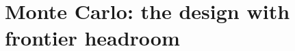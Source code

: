 \documentclass[
  12pt]{article}
\newcommand{\1}[1]{\mathds{1}\left[#1\right]}
\theoremstyle{plain}
\theoremstyle{definition}
\theoremstyle{definition}
\theoremstyle{remark}
\begin{document}
%
%
%
%
\clearpage
\makeatletter
{}
\makeatother

\section*{Monte Carlo: the design with frontier headroom}
\end{document}
